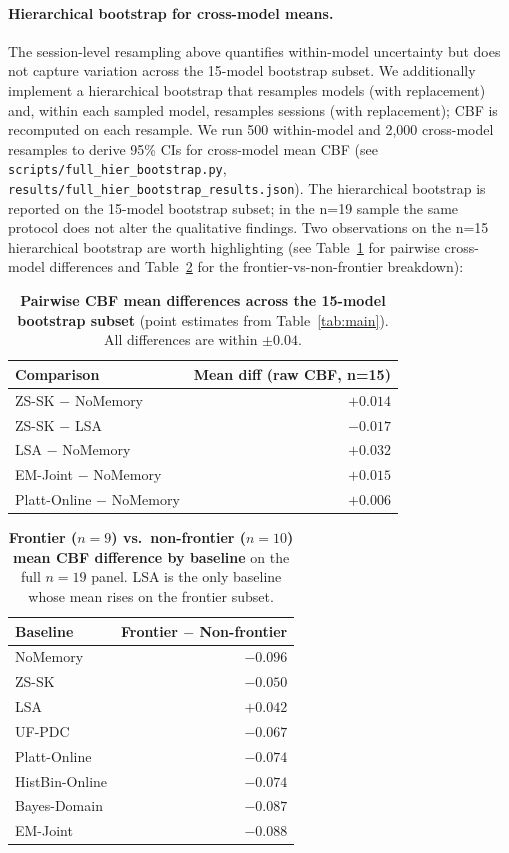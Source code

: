 \documentclass[11pt]{article}
\begin{document}
\paragraph{Hierarchical bootstrap for cross-model means.} The session-level resampling above quantifies within-model uncertainty but does not capture variation across the 15-model bootstrap subset. We additionally implement a hierarchical bootstrap that resamples models (with replacement) and, within each sampled model, resamples sessions (with replacement); CBF is recomputed on each resample. We run 500 within-model and 2{,}000 cross-model resamples to derive 95\% CIs for cross-model mean CBF (see \texttt{scripts/full\_hier\_bootstrap.py}, \texttt{results/full\_hier\_bootstrap\_results.json}). The hierarchical bootstrap is reported on the 15-model bootstrap subset; in the n=19 sample the same protocol does not alter the qualitative findings. Two observations on the n=15 hierarchical bootstrap are worth highlighting (see Table~\ref{tab:boot_pairs} for pairwise cross-model differences and Table~\ref{tab:boot_frontier} for the frontier-vs-non-frontier breakdown):

\begin{table}[h]
\centering
\small
\caption{\textbf{Pairwise CBF mean differences across the 15-model bootstrap subset} (point estimates from Table~\ref{tab:main}). All differences are within $\pm 0.04$.}
\label{tab:boot_pairs}
\begin{tabular}{l r}
\toprule
\textbf{Comparison} & \textbf{Mean diff (raw CBF, n=15)} \\
\midrule
ZS-SK $-$ NoMemory      & $+0.014$ \\
ZS-SK $-$ LSA & $-0.017$ \\
LSA $-$ NoMemory    & $+0.032$ \\
EM-Joint $-$ NoMemory         & $+0.015$ \\
Platt-Online $-$ NoMemory     & $+0.006$ \\
\bottomrule
\end{tabular}
\end{table}

\begin{table}[h]
\centering
\small
\caption{\textbf{Frontier ($n{=}9$) vs.\ non-frontier ($n{=}10$) mean CBF difference by baseline} on the full $n{=}19$ panel. LSA is the only baseline whose mean rises on the frontier subset.}
\label{tab:boot_frontier}
\begin{tabular}{l r}
\toprule
\textbf{Baseline} & \textbf{Frontier $-$ Non-frontier} \\
\midrule
NoMemory       & $-0.096$ \\
ZS-SK          & $-0.050$ \\
LSA            & $+0.042$ \\
UF-PDC         & $-0.067$ \\
Platt-Online   & $-0.074$ \\
HistBin-Online & $-0.074$ \\
Bayes-Domain   & $-0.087$ \\
EM-Joint       & $-0.088$ \\
\bottomrule
\end{tabular}
\end{table}
\end{document}
